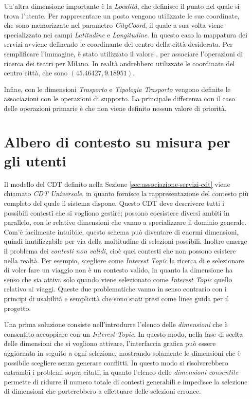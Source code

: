 Un'altra dimensione importante è la \emph{Località}, che definisce il punto nel quale si trova l'utente. Per rappresentare un posto vengono utilizzate le sue coordinate, che sono memorizzate nel parametro \emph{CityCoord}, il quale a sua volta viene specializzato nei campi \emph{Latitudine} e \emph{Longitudine}. In questo caso la mappatura dei servizi avviene definendo le coordinante del centro della città desiderata. Per semplificare l'immagine, è stato utilizzato il valore , per associare l'operazioni di ricerca dei teatri per Milano. In realtà andrebbero utilizzate le coordinate del centro città, che sono $ (45.46427, 9.18951) $.

Infine, con le dimensioni \emph{Trasporto} e \emph{Tipologia Trasporto} vengono definite le associazioni con le operazioni di supporto. La principale differenza con il caso delle operazioni primarie è che non viene definito nessun valore di priorità.

\section{Albero di contesto su misura per gli utenti\label{sec:cdt-su-misura}}

Il modello del CDT definito nella Sezione \ref{sec:associazione-servizi-cdt} viene chiamato \emph{CDT Universale}, in quanto fornisce la rappresentazione del contesto più completo del quale il sistema dispone. Questo CDT deve descrivere tutti i possibili contesti che si vogliono gestire; possono coesistere diversi ambiti in parallelo, con le relative dimensioni che vanno a specializzare il dominio generale. Com'è facilmente intuibile, questo schema può diventare di enormi dimensioni, quindi inutilizzabile per via della moltitudine di selezioni possibili. Inoltre emerge il problema dei \emph{contesti non validi}, cioè quei contesti che non possono esistere nella realtà. Per esempio, scegliere come \emph{Interest Topic} la ricerca di  e selezionare di voler fare un viaggio  non è un contesto valido, in quanto la dimensione  ha senso che sia attiva solo quando viene selezionato come \emph{Interest Topic} quello relativo ai viaggi. Queste due problematiche vanno in senso contrario con i principi di usabilità e semplicità che sono stati presi come linee guida per il progetto.

Una prima soluzione consiste nell'introdurre l'elenco delle \emph{dimensioni} che è consentito accoppiare con un \emph{Interest Topic}. In questo modo, nella fase di scelta delle dimensioni che si vogliono attivare, l'interfaccia grafica può essere aggiornata in seguito a ogni selezione, mostrando solamente le dimensioni che è possibile scegliere senza generare conflitti. In questo modo si risolverebbero entrambi i problemi sopra citati, in quanto l'elenco delle \emph{dimensioni consentite} permette di ridurre il numero totale di contesti generabili e impedisce la selezione di dimensioni che porterebbero a effettuare delle selezioni erronee.

